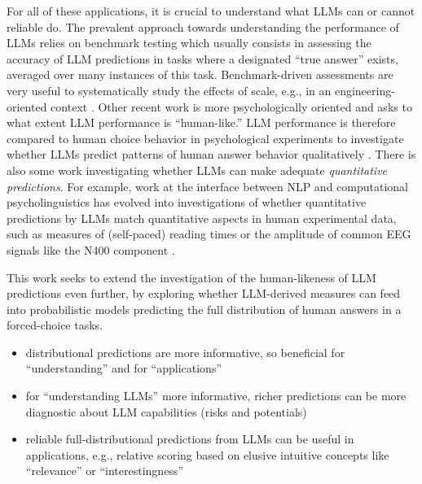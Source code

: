 \documentclass[fleqn]{article}
\begin{document}
For all of these applications, it is crucial to understand what LLMs can or cannot reliable do.
The prevalent approach towards understanding the performance of LLMs relies on benchmark testing which usually consists in assessing the accuracy of LLM predictions in tasks where a designated ``true answer'' exists, averaged over many instances of this task.
Benchmark-driven assessments are very useful to systematically study the effects of scale, e.g., in an engineering-oriented context \citep[e.g.,][]{srivastava2023-BIGbench}.
Other recent work is more psychologically oriented and asks to what extent LLM performance is ``human-like.''
LLM performance is therefore compared to human choice behavior in psychological experiments to investigate whether LLMs predict patterns of human answer behavior qualitatively \citep[e.g.,][]{BinzSchulz2023:Using-cognitive,Hagendorff2023:Machine-Psychol,ShiffrinMitchell2023:Probing-the-psy}.
There is also some work investigating whether LLMs can make adequate \emph{quantitative predictions}.
For example, work at the interface between NLP and computational psycholinguistics \citep{MarvinLinzen2018:Targeted-Syntac,HuGauthier2020:A-Systematic-As} has evolved into investigations of whether quantitative predictions by LLMs match quantitative aspects in human experimental data, such as measures of (self-paced) reading times \citep{WilcoxVani2021:A-Targeted-Asse} or the amplitude of common EEG signals like the N400 component \citep{LindborgRabovsky2021:Meaning-in-brai}.

This work seeks to extend the investigation of the human-likeness of LLM predictions even further, by exploring whether LLM-derived measures can feed into probabilistic models predicting the full distribution of human answers in a forced-choice tasks.

\begin{itemize}
  \item distributional predictions are more informative, so beneficial for ``understanding'' and for ``applications''
  \item for ``understanding LLMs'' more informative, richer predictions can be more diagnostic about LLM capabilities (risks and potentials)
  \item reliable full-distributional predictions from LLMs can be useful in applications, e.g., relative scoring based on elusive intuitive concepts like ``relevance'' or ``interestingness''
\end{itemize}

\end{document}
